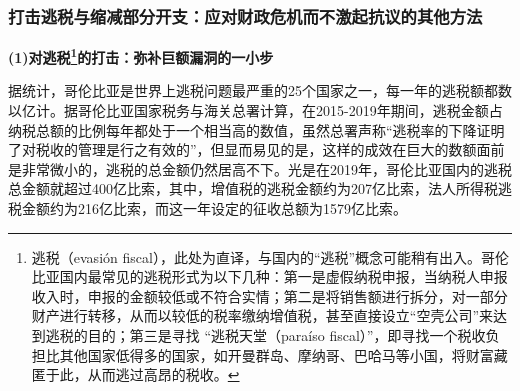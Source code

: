 \documentclass{phyasgn}\usepackage{nag}
\begin{document}
\subsubsection{打击逃税与缩减部分开支：应对财政危机而不激起抗议的其他方法}
\par \textbf{(1)对逃税\footnote[37]{逃税（evasión fiscal），此处为直译，与国内的“逃税”概念可能稍有出入。哥伦比亚国内最常见的逃税形式为以下几种：第一是虚假纳税申报，当纳税人申报收入时，申报的金额较低或不符合实情；第二是将销售额进行拆分，对一部分财产进行转移，从而以较低的税率缴纳增值税，甚至直接设立“空壳公司”来达到逃税的目的；第三是寻找 “逃税天堂（paraíso fiscal）”，即寻找一个税收负担比其他国家低得多的国家，如开曼群岛、摩纳哥、巴哈马等小国，将财富藏匿于此，从而逃过高昂的税收。}的打击：弥补巨额漏洞的一小步}
\par 据统计，哥伦比亚是世界上逃税问题最严重的25个国家之一，每一年的逃税额都数以亿计。据哥伦比亚国家税务与海关总署计算，在2015-2019年期间，逃税金额占纳税总额的比例每年都处于一个相当高的数值，虽然总署声称“逃税率的下降证明了对税收的管理是行之有效的”，但显而易见的是，这样的成效在巨大的数额面前是非常微小的，逃税的总金额仍然居高不下。光是在2019年，哥伦比亚国内的逃税总金额就超过400亿比索，其中，增值税的逃税金额约为207亿比索，法人所得税逃税金额约为216亿比索，而这一年设定的征收总额为1579亿比索。
\end{document}
